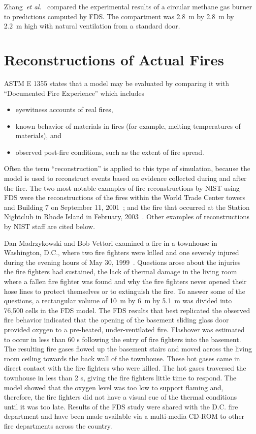 Zhang~{\em et al.}~\cite{Zhang:1} compared the experimental results of a  circular methane  gas burner  to predictions  computed by  FDS. The
compartment was 2.8~m by 2.8~m  by 2.2~m high with natural ventilation from a  standard door.




\section{Reconstructions of Actual Fires}

ASTM E 1355 states that a model may be evaluated by comparing it with ``Documented Fire Experience'' which includes
\begin{itemize}
\item eyewitness accounts of real fires,
\item known behavior of materials in fires (for example, melting temperatures of materials), and
\item observed post-fire conditions, such as the extent of fire spread.
\end{itemize}
Often the term ``reconstruction'' is applied to this type of simulation, because the model is used to reconstruct events based on evidence collected during and after the
fire. The two most
notable examples of fire reconstructions by NIST using FDS were the reconstructions of the fires within the World Trade Center towers and Building 7 on September 11, 2001~\cite{NIST_NCSTAR_1-5F};
and the fire that occurred at the Station Nightclub in Rhode Island in February, 2003~\cite{Grosshandler:Station}. Other examples of reconstructions by NIST staff are
cited below.


Dan Madrzykowski and Bob Vettori examined a fire in a townhouse in Washington, D.C., where
two fire fighters were killed and one severely injured during the evening hours of May 30, 1999~\cite{Madrzykowski:1}. Questions arose
about the injuries the fire fighters had sustained, the lack of thermal damage in the living room where a fallen fire fighter was found and why the
fire fighters never opened their hose lines to protect themselves or to extinguish the fire.
To answer some of the questions, a rectangular volume of 10~m by 6~m by 5.1~m was divided into 76,500 cells in the FDS model. The FDS results that
best replicated the observed fire behavior indicated that the opening of the basement sliding glass door provided oxygen to a pre-heated,
under-ventilated fire. Flashover was estimated to occur in less than 60 s following the entry of fire fighters into the basement. The resulting fire
gases flowed up the basement stairs and moved across the living room ceiling towards the back wall of the townhouse. These hot gases came in direct
contact with the fire fighters who were killed. The hot gases traversed the townhouse in less than 2 s, giving the fire fighters little time to
respond. The model showed that the oxygen level was too low to support flaming and, therefore, the fire fighters did not have a visual cue of the
thermal conditions until it was too late. Results of the FDS study were shared with the D.C. fire department and have been made available via a
multi-media CD-ROM to other fire departments across the country.

